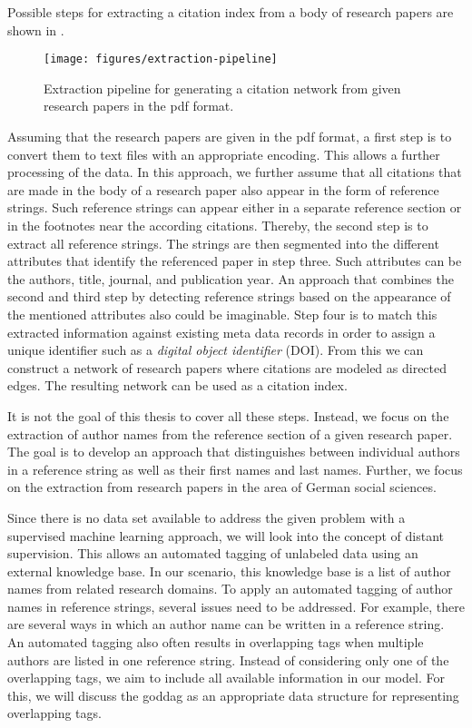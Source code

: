 Possible steps for extracting a citation index from a body of research papers are shown in .
\begin{figure}[t]
\texttt{[image: figures/extraction-pipeline]}
\caption{Extraction pipeline for generating a citation network from given research papers in the \gls{pdf} format.}
\label{fig:extraction-pipeline}
\end{figure}
Assuming that the research papers are given in the \gls{pdf} format, a first step is to convert them to text files with an appropriate encoding.
This allows a further processing of the data.
In this approach, we further assume that all citations that are made in the body of a research paper also appear in the form of reference strings.
Such reference strings can appear either in a separate reference section or in the footnotes near the according citations.
Thereby, the second step is to extract all reference strings.
The strings are then segmented into the different attributes that identify the referenced paper in step three.
Such attributes can be the authors, title, journal, and publication year.
An approach that combines the second and third step by detecting reference strings based on the appearance of the mentioned attributes also could be imaginable.
Step four is to match this extracted information against existing meta data records in order to assign a unique identifier such as a \textit{digital object identifier} (DOI).
From this we can construct a network of research papers where citations are modeled as directed edges.
The resulting network can be used as a citation index.

It is not the goal of this thesis to cover all these steps.
Instead, we focus on the extraction of author names from the reference section of a given research paper.
The goal is to develop an approach that distinguishes between individual authors in a reference string as well as their first names and last names.
Further, we focus on the extraction from research papers in the area of German social sciences.

\bigskip

Since there is no data set available to address the given problem with a supervised machine learning approach, we will look into the concept of distant supervision.
This allows an automated tagging of unlabeled data using an external knowledge base.
In our scenario, this knowledge base is a list of author names from related research domains.
To apply an automated tagging of author names in reference strings, several issues need to be addressed.
For example, there are several ways in which an author name can be written in a reference string.
An automated tagging also often results in overlapping tags when multiple authors are listed in one reference string.
Instead of considering only one of the overlapping tags, we aim to include all available information in our model.
For this, we will discuss the \gls{goddag} as an appropriate data structure for representing overlapping tags.

